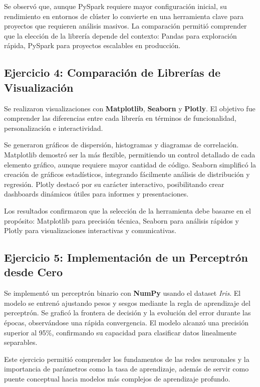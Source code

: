 \documentclass[12pt,a4paper]{article}
\begin{document}
Se observó que, aunque PySpark requiere mayor configuración inicial, su rendimiento en entornos de clúster lo convierte en una herramienta clave para proyectos que requieren análisis masivos.  
La comparación permitió comprender que la elección de la librería depende del contexto: Pandas para exploración rápida, PySpark para proyectos escalables en producción.

\subsection{Ejercicio 4: Comparación de Librerías de Visualización}
Se realizaron visualizaciones con \textbf{Matplotlib}, \textbf{Seaborn} y \textbf{Plotly}.  
El objetivo fue comprender las diferencias entre cada librería en términos de funcionalidad, personalización e interactividad.  

Se generaron gráficos de dispersión, histogramas y diagramas de correlación.  
Matplotlib demostró ser la más flexible, permitiendo un control detallado de cada elemento gráfico, aunque requiere mayor cantidad de código.  
Seaborn simplificó la creación de gráficos estadísticos, integrando fácilmente análisis de distribución y regresión.  
Plotly destacó por su carácter interactivo, posibilitando crear dashboards dinámicos útiles para informes y presentaciones.  

Los resultados confirmaron que la selección de la herramienta debe basarse en el propósito: Matplotlib para precisión técnica, Seaborn para análisis rápidos y Plotly para visualizaciones interactivas y comunicativas.

\subsection{Ejercicio 5: Implementación de un Perceptrón desde Cero}
Se implementó un perceptrón binario con \textbf{NumPy} usando el dataset \textit{Iris}.  
El modelo se entrenó ajustando pesos y sesgos mediante la regla de aprendizaje del perceptrón.  
Se graficó la frontera de decisión y la evolución del error durante las épocas, observándose una rápida convergencia.  
El modelo alcanzó una precisión superior al 95\%, confirmando su capacidad para clasificar datos linealmente separables.  

Este ejercicio permitió comprender los fundamentos de las redes neuronales y la importancia de parámetros como la tasa de aprendizaje, además de servir como puente conceptual hacia modelos más complejos de aprendizaje profundo.
\end{document}
